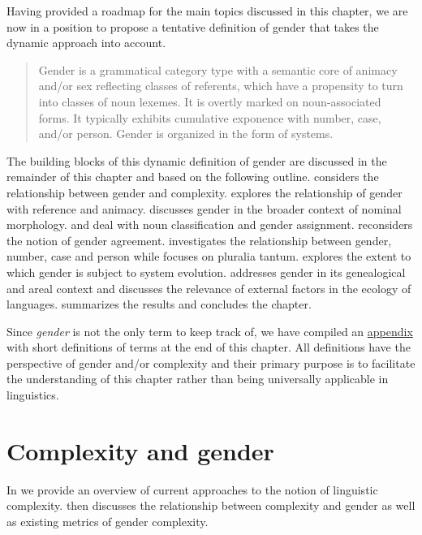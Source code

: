 \documentclass[output=collectionpaper]{langsci/langscibook}
\begin{document}
Having provided a roadmap for the main topics discussed in this chapter, we are now in a position to propose a tentative definition of gender that takes the dynamic approach into account.

\begin{quote}
Gender is a grammatical category type with a semantic core of animacy and/or sex reflecting classes of referents, which have a propensity to turn into classes of noun lexemes. It is overtly marked on noun-associated forms. It typically exhibits cumulative exponence with number, case, and/or person. Gender is organized in the form of systems.
\end{quote}

\noindent The building blocks of this dynamic definition of gender are discussed in the remainder of this chapter and based on the following outline.  considers the relationship between gender and complexity.  explores the relationship of gender with reference and animacy.  discusses gender in the broader context of nominal morphology.  and  deal with noun classification and gender assignment.  reconsiders the notion of gender agreement.  investigates the relationship between gender, number, case and person while  focuses on pluralia tantum.  explores the extent to which gender is subject to system evolution.  addresses gender in its genealogical and areal context and discusses the relevance of external factors in the ecology of languages.  summarizes the results and concludes the chapter.

Since \textit{gender} is not the only term to keep track of, we have compiled an \hyperref[WDG:appendix]{appendix} with short definitions of terms at the end of this chapter. All definitions have the perspective of gender and/or complexity and their primary purpose is to facilitate the understanding of this chapter rather than being universally applicable in linguistics.

\section{Complexity and gender}
\label{sec:WDG:2}

In  we provide an overview of current approaches to the notion of linguistic complexity.  then discusses the relationship between complexity and gender as well as existing metrics of gender complexity.
\end{document}
